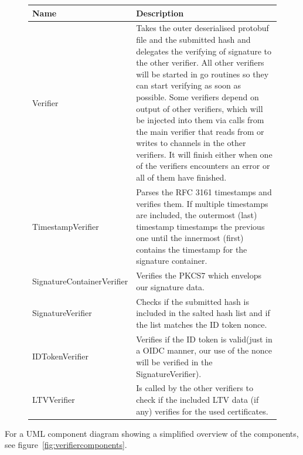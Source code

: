\begin{figure}[H]
	\begin{center}
		\begin{tabular}{p{4.2cm}|p{12cm}}
			\textbf{Name} & \textbf{Description}
			\\ \hline
			Verifier &
			Takes the outer deserialised protobuf file and the submitted hash and delegates the verifying of signature to the other verifier.
			All other verifiers will be started in go routines so they can start verifying as soon as possible.
			Some verifiers depend on output of other verifiers, which will be injected into them via calls from the main verifier that reads from or writes to channels in the other verifiers.
			It will finish either when one of the verifiers encounters an error or all of them have finished.
			\\ \hline
			TimestampVerifier &
			Parses the RFC 3161 timestamps and verifies them.
			If multiple timestamps are included, the outermost (last) timestamp timestamps the previous one until the innermost (first) contains the timestamp for the signature container.
			\\ \hline
			SignatureContainerVerifier &
			Verifies the \gls{PKCS7} which envelops our signature data.
			\\ \hline
			SignatureVerifier &
			Checks if the submitted hash is included in the salted hash list and if the list matches the ID token nonce.
			\\ \hline
			IDTokenVerifier &
			Verifies if the ID token is valid(just in a OIDC manner, our use of the nonce will be verified in the SignatureVerifier).
			\\ \hline
			LTVVerifier &
			Is called by the other verifiers to check if the included \gls{LTV} data (if any) verifies for the used certificates.
		\end{tabular}
	\end{center}
\end{figure}

For a \gls{UML} component diagram showing a simplified overview of the components, see figure~\ref{fig:verifiercomponents}.

